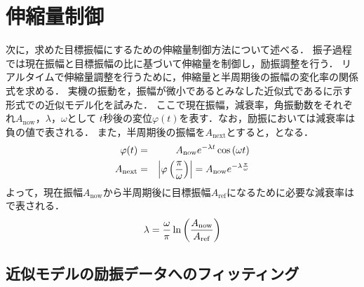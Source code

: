         \section{伸縮量制御}
          次に，求めた目標振幅にするための伸縮量制御方法について述べる．
          振子過程では現在振幅と目標振幅の比に基づいて伸縮量を制御し，励振調整を行う．
          リアルタイムで伸縮量調整を行うために，伸縮量と半周期後の振幅の変化率の関係式を求める．
          実機の振動を，振幅が微小であるとみなした近似式であるに示す形式での近似モデル化を試みた．
          ここで現在振幅，減衰率，角振動数をそれぞれ$A_{\mathrm{now}}$，$\lambda$，$\omega$として
          $t$秒後の変位$\varphi(t)$を表す．なお，励振においては減衰率は負の値で表される．
          また，半周期後の振幅を$A_{\mathrm{next}}$とすると，となる．
          \begin{eqnarray}
            \equlabel{Approximation Model}
            \varphi(t)&=&A_{\mathrm{now}}e^{-\lambda t}\cos{(\omega t)}\\
            \equlabel{amp rate}
            A_{\mathrm{next}}&=&\left|\varphi\left(\frac{\pi}{\omega}\right)\right|=A_{\mathrm{now}}e^{-\lambda \frac{\pi}{\omega}}
          \end{eqnarray}
          よって，現在振幅$A_{\mathrm{now}}$から半周期後に目標振幅$A_{\mathrm{ref}}$になるために必要な減衰率はで表される．
          \begin{eqnarray}
            \equlabel{lambda}
            \lambda=\frac{\omega}{\pi}\ln{\left(\frac{A_{\mathrm{now}}}{A_{\mathrm{ref}}}\right)}
          \end{eqnarray}

        \subsection{近似モデルの励振データへのフィッティング}
          
